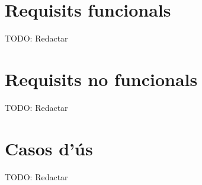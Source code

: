 
\section{Requisits funcionals}

TODO: Redactar


\section{Requisits no funcionals}

TODO: Redactar


\section{Casos d'ús}

TODO: Redactar